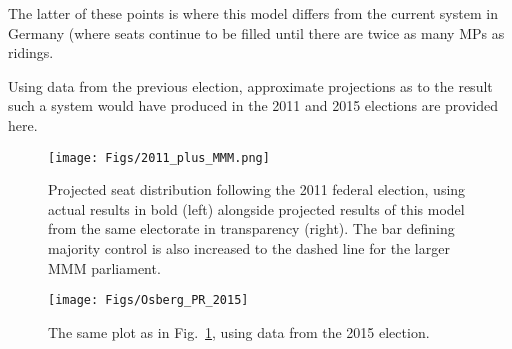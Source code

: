 \documentclass[DIV=calc, paper=a4, fontsize=11pt, twocolumn]{scrartcl}	 %
\begin{document}
The latter of these points is where this model differs from the current system in Germany (where seats continue to be filled until there are twice as many MPs as ridings. 

Using data from the previous election, approximate projections as to the result such a system would have produced in the 2011 and 2015 elections are provided here.


\begin{figure}[h!]
  \texttt{[image: Figs/2011\_plus\_MMM.png]}
  \caption{Projected seat distribution following the 2011 federal election, using actual results in bold (left) alongside projected results of this model from the same electorate in transparency (right). The bar defining majority control is also increased to the dashed line for the larger MMM parliament.
}
\label{fig:hypo_2011_sum}
\end{figure}


\begin{figure}[h!]
  \texttt{[image: Figs/Osberg\_PR\_2015]}
  \caption{The same plot as in Fig.~\ref{fig:hypo_2011_sum}, using data from the 2015 election.}
\label{fig:hypo_2015_sum}
\end{figure}

\pagebreak

\maketitle %
\thispagestyle{fancy} %

\end{document}
